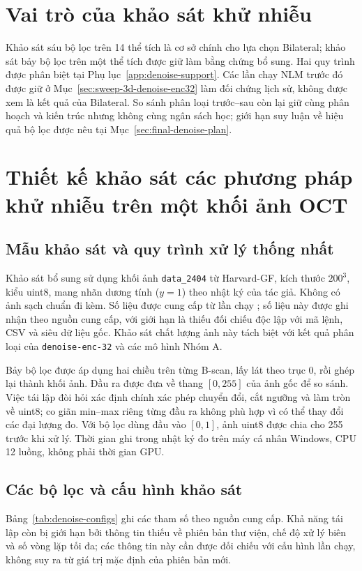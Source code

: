 \section{Vai trò của khảo sát khử nhiễu}
Khảo sát sáu bộ lọc trên 14 thể tích là cơ sở chính cho lựa chọn
Bilateral; khảo sát bảy bộ lọc trên một thể tích được giữ làm bằng
chứng bổ sung. Hai quy trình được phân biệt tại
Phụ lục~\ref{app:denoise-support}. Các lần chạy NLM trước đó
được giữ ở Mục~\ref{sec:sweep-3d-denoise-enc32} làm đối chứng lịch sử, không
được xem là kết quả của Bilateral. So sánh phân loại trước--sau còn lại
giữ cùng phân hoạch và kiến trúc nhưng không cùng ngân sách học;
giới hạn suy luận về hiệu quả bộ lọc được nêu tại Mục~\ref{sec:final-denoise-plan}.

\section{Thiết kế khảo sát các phương pháp khử nhiễu trên một khối ảnh OCT}
\label{sec:denoise-comparison-method}

\subsection{Mẫu khảo sát và quy trình xử lý thống nhất}
Khảo sát bổ sung sử dụng khối ảnh \texttt{data\_2404} từ Harvard-GF,
kích thước $200^3$, kiểu uint8, mang nhãn dương tính ($y=1$) theo nhật ký
của tác giả. Không có ảnh sạch chuẩn đi kèm. Số liệu được cung cấp từ lần chạy
; số liệu này được ghi nhận
theo nguồn cung cấp, với giới hạn là thiếu đối chiếu độc lập với mã lệnh, CSV và siêu dữ liệu gốc.
Khảo sát chất lượng ảnh này tách biệt với kết quả phân loại của
\texttt{denoise-enc-32} và các mô hình Nhóm A.

Bảy bộ lọc được áp dụng hai chiều trên từng B-scan, lấy lát theo trục 0,
rồi ghép lại thành khối ảnh. Đầu ra được đưa về thang $[0,255]$ của ảnh gốc
để so sánh. Việc tái lập đòi hỏi xác định chính xác phép chuyển đổi, cắt ngưỡng và làm tròn về
uint8; co giãn min--max riêng từng đầu ra không phù hợp vì có thể thay đổi
các đại lượng đo. Với bộ lọc dùng đầu vào $[0,1]$, ảnh uint8 được chia cho
255 trước khi xử lý. Thời gian ghi trong nhật ký đo trên máy cá nhân
Windows, CPU 12 luồng, không phải thời gian GPU.

\subsection{Các bộ lọc và cấu hình khảo sát}
Bảng~\ref{tab:denoise-configs} ghi các tham số theo nguồn cung cấp. Khả năng
tái lập còn bị giới hạn bởi thông tin thiếu về phiên bản thư viện, chế độ xử lý biên
và số vòng lặp tối đa; các thông tin này cần được đối chiếu với cấu hình lần chạy,
không suy ra từ giá trị mặc định của phiên bản mới.

